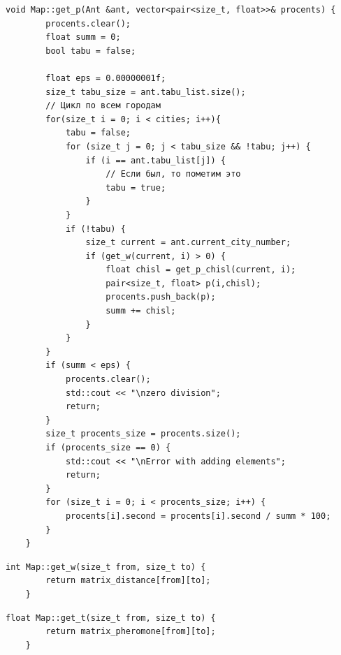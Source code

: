 \documentclass[a4paper, 14pt]{article}
\begin{document}
	\begin{lstlisting}[label=code:get_p,caption=Функция get\_p - получить массив вероятностей]
       void Map::get_p(Ant &ant, vector<pair<size_t, float>>& procents) {
        procents.clear();
        float summ = 0;
        bool tabu = false;
    
        float eps = 0.00000001f;
        size_t tabu_size = ant.tabu_list.size();
        // Цикл по всем городам
        for(size_t i = 0; i < cities; i++){
            tabu = false;
            for (size_t j = 0; j < tabu_size && !tabu; j++) {
                if (i == ant.tabu_list[j]) {
                    // Если был, то пометим это
                    tabu = true;
                }
            }
            if (!tabu) {
                size_t current = ant.current_city_number;
                if (get_w(current, i) > 0) {
                    float chisl = get_p_chisl(current, i);
                    pair<size_t, float> p(i,chisl);
                    procents.push_back(p);
                    summ += chisl;
                }
            }
        }
        if (summ < eps) {
            procents.clear();
            std::cout << "\nzero division";
            return;
        }
        size_t procents_size = procents.size();
        if (procents_size == 0) {
            std::cout << "\nError with adding elements";
            return;
        }
        for (size_t i = 0; i < procents_size; i++) {
            procents[i].second = procents[i].second / summ * 100;
        }
    }
	\end{lstlisting}
    
    \begin{lstlisting}[label=code:get_w,caption=Функция get\_w - получить расстояние до города to из from]
    int Map::get_w(size_t from, size_t to) {
        return matrix_distance[from][to];
    }
	\end{lstlisting}
    
    \begin{lstlisting}[label=code:get_t,caption=Функци
    я get\_t - получить количество феромонов на пути к городу to из города from]
    float Map::get_t(size_t from, size_t to) {
        return matrix_pheromone[from][to];
    }
	\end{lstlisting}
	
\end{document}
